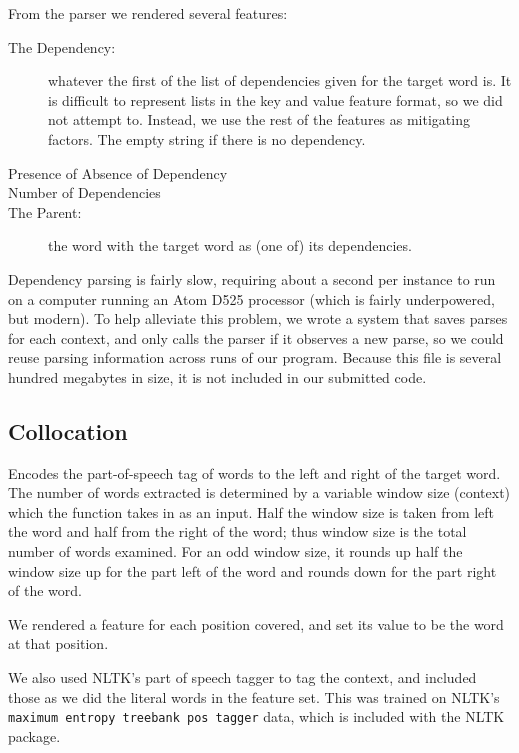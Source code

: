 \documentclass{article}
\begin{document}
From the parser we rendered several features:

\begin{description}

\item[The Dependency:] whatever the first of the list of dependencies given for
the target word is.  It is difficult to represent lists in the key and value
feature format, so we did not attempt to.  Instead, we use the rest of the
features as mitigating factors.  The empty string if there is no dependency.

\item[Presence of Absence of Dependency]

\item[Number of Dependencies]

\item[The Parent:] the word with the target word as (one of) its dependencies.

\end{description}

Dependency parsing is fairly slow, requiring about a second per instance to run
on a computer running an Atom D525 processor (which is fairly underpowered, but
modern).  To help alleviate this problem, we wrote a system that saves parses
for each context, and only calls the parser if it observes a new parse, so we
could reuse parsing information across runs of our program.  Because this file
is several hundred megabytes in size, it is not included in our
submitted code.

\subsection{Collocation}

Encodes the part-of-speech tag of words to the left and right of the target
word. The number of words extracted is determined by a variable window size
(context) which the function takes in as an input. Half the window size is
taken from left the word and half from the right of the word; thus window size
is the total number of words examined. For an odd window size, it rounds up
half the window size up for the part left of the word and rounds down for the
part right of the word.

We rendered a feature for each position covered, and set its value to be the
word at that position.

We also used NLTK's part of speech tagger to tag the context, and included those
as we did the literal words in the feature set.  This was trained on NLTK's
\verb+maximum entropy treebank pos tagger+ data, which is included with the NLTK
package.
\end{document}
